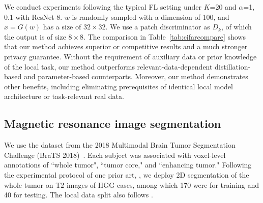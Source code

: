 \documentclass[letterpaper]{article} %
\makeatletter
\DeclareRobustCommand\onedot{\futurelet\@let@token\@onedot}
\def\@onedot{\ifx\@let@token.\else.\null\fi\xspace}
\def\eg{\emph{e.g}\onedot} \def\Eg{\emph{E.g}\onedot}
\makeatother
\begin{document}
We conduct experiments following the typical FL setting \cite{lin2020ensemble} under $K$=20 and $\alpha$=1, 0.1 with ResNet-8. %
$w$ is randomly sampled with a dimension of 100, and $x=G(w)$ has a size of $32 \times 32$. We use a patch discriminator as $D_k$, of which the output is of size $8 \times 8$.
The comparison in Table~\ref{tab:cifarcompare} shows that our method achieves superior or competitive results and a much stronger privacy guarantee.
Without the requirement of auxiliary data or prior knowledge of the local task, our method outperforms relevant-data-dependent distillation-based and parameter-based counterparts.
Moreover, our method demonstrates other benefits, including eliminating prerequisites of identical local model architecture or task-relevant real data.

\subsection{Magnetic resonance image segmentation}
We use the dataset from the 2018 Multimodal Brain Tumor Segmentation Challenge (BraTS 2018)~\cite{menze2014multimodal, bakas2018identifying}.
Each subject was associated with voxel-level annotations of ``whole tumor", ``tumor core," and ``enhancing tumor."
Following the experimental protocol of one prior art, \cite{chang2020synthetic}, we deploy 2D segmentation of the whole tumor on T2 images of HGG cases, among which 170 were for training and 40 for testing. The local data split also follows \cite{chang2020synthetic}.%
\end{document}
